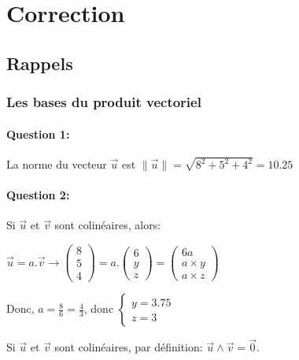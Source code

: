 \ifdef{\public}{}

\newpage

\pagestyle{correction}

\section{Correction}

\subsection{Rappels}

\subsubsection{Les bases du produit vectoriel}

\paragraph{Question 1:} La norme du vecteur $\overrightarrow{u}$ est $\|\overrightarrow{u}\|=\sqrt{8^2+5^2+4^2}=10.25$

\paragraph{Question 2:} Si $\overrightarrow{u}$ et $\overrightarrow{v}$ sont colinéaires, alors: 

$\overrightarrow{u}=a.\overrightarrow{v}\rightarrow \left(\begin{array}{c}8 \\ 5 \\ 4 \end{array}\right)=a.\left(\begin{array}{c}6 \\ y \\ z \end{array}\right)=\left(\begin{array}{c} 6a \\ a\times y \\ a\times z \end{array}\right)$

Donc, $a=\frac{8}{6}=\frac{4}{3}$, donc $\left\{\begin{array}{c}y=3.75 \\ z=3 \end{array}\right.$

Si $\overrightarrow{u}$ et $\overrightarrow{v}$ sont colinéaires, par définition: $\overrightarrow{u} \wedge \overrightarrow{v}=\overrightarrow{0}$.

